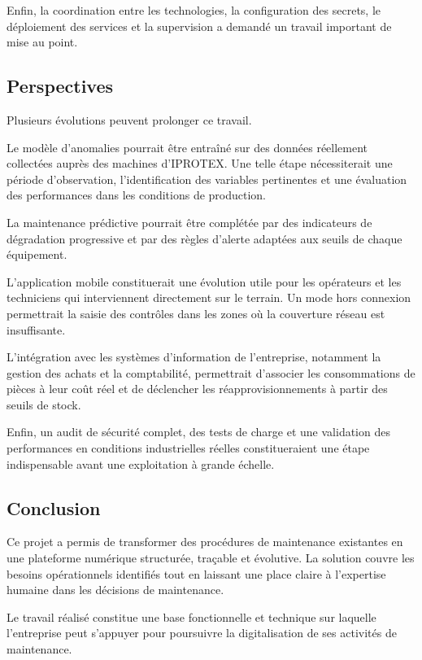 Enfin, la coordination entre les technologies, la configuration des secrets, le déploiement des services et la supervision a demandé un travail important de mise au point.

\subsection*{Perspectives}

Plusieurs évolutions peuvent prolonger ce travail.

Le modèle d’anomalies pourrait être entraîné sur des données réellement collectées auprès des machines d’IPROTEX. Une telle étape nécessiterait une période d’observation, l’identification des variables pertinentes et une évaluation des performances dans les conditions de production.

La maintenance prédictive pourrait être complétée par des indicateurs de dégradation progressive et par des règles d’alerte adaptées aux seuils de chaque équipement.

L’application mobile constituerait une évolution utile pour les opérateurs et les techniciens qui interviennent directement sur le terrain. Un mode hors connexion permettrait la saisie des contrôles dans les zones où la couverture réseau est insuffisante.

L’intégration avec les systèmes d’information de l’entreprise, notamment la gestion des achats et la comptabilité, permettrait d’associer les consommations de pièces à leur coût réel et de déclencher les réapprovisionnements à partir des seuils de stock.

Enfin, un audit de sécurité complet, des tests de charge et une validation des performances en conditions industrielles réelles constitueraient une étape indispensable avant une exploitation à grande échelle.

\subsection*{Conclusion}

Ce projet a permis de transformer des procédures de maintenance existantes en une plateforme numérique structurée, traçable et évolutive. La solution couvre les besoins opérationnels identifiés tout en laissant une place claire à l’expertise humaine dans les décisions de maintenance.

Le travail réalisé constitue une base fonctionnelle et technique sur laquelle l’entreprise peut s’appuyer pour poursuivre la digitalisation de ses activités de maintenance.
